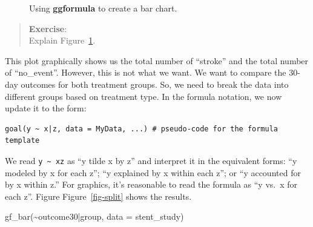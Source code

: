 \documentclass[
  letterpaper,
  DIV=11,
  numbers=noendperiod]{scrreprt}
\newenvironment{Shaded}{\begin{snugshade}}{\end{snugshade}}
\newcommand{\AttributeTok}[1]{\textcolor[rgb]{0.40,0.45,0.13}{#1}}
\newcommand{\FunctionTok}[1]{\textcolor[rgb]{0.28,0.35,0.67}{#1}}
\newcommand{\NormalTok}[1]{\textcolor[rgb]{0.00,0.23,0.31}{#1}}
\newcommand{\SpecialCharTok}[1]{\textcolor[rgb]{0.37,0.37,0.37}{#1}}
\begin{document}
\begin{figure}[H]


\caption{\label{fig-first}Using \textbf{ggformula} to create a bar
chart.}

\end{figure}%

\begin{quote}
\textbf{Exercise}:\\
Explain Figure~\ref{fig-first}.
\end{quote}

This plot graphically shows us the total number of ``stroke'' and the
total number of ``no\_event''. However, this is not what we want. We
want to compare the 30-day outcomes for both treatment groups. So, we
need to break the data into different groups based on treatment type. In
the formula notation, we now update it to the form:

\begin{verbatim}
goal(y ~ x|z, data = MyData, ...) # pseudo-code for the formula template
\end{verbatim}

We read \texttt{y\ \textasciitilde{}\ x\textbar{}z} as ``y tilde x by
z'' and interpret it in the equivalent forms: ``y modeled by x for each
z''; ``y explained by x within each z''; or ``y accounted for by x
within z.'' For graphics, it's reasonable to read the formula as ``y
vs.~x for each z''. Figure Figure~\ref{fig-split} shows the results.

\begin{Shaded}
\begin{Highlighting}[]
\FunctionTok{gf\_bar}\NormalTok{(}\SpecialCharTok{\textasciitilde{}}\NormalTok{outcome30}\SpecialCharTok{|}\NormalTok{group, }\AttributeTok{data =}\NormalTok{ stent\_study) }
\end{Highlighting}
\end{Shaded}
\end{document}
